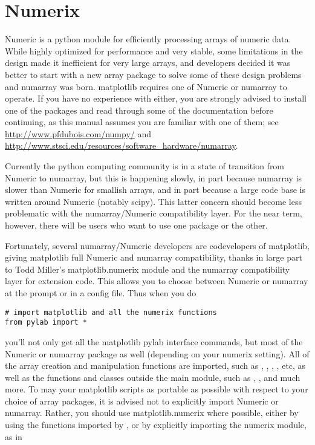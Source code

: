 \documentclass[twoside]{book}
\begin{document}
\section{Numerix}
\label{sec:numerix}

Numeric is a python module for efficiently processing arrays of
numeric data.  While highly optimized for performance and very stable,
some limitations in the design made it inefficient for very large
arrays, and developers decided it was better to start with a new array
package to solve some of these design problems and numarray was born.
matplotlib requires one of Numeric or numarray to operate.  If you
have no experience with either, you are strongly advised to install
one of the packages and read through some of the documentation before
continuing, as this manual assumes you are familiar with one of them;
see \url{http://www.pfdubois.com/numpy/} and
\url{http://www.stsci.edu/resources/software_hardware/numarray}.

Currently the python computing community is in a state of transition
from Numeric to numarray, but this is happening slowly, in part
because numarray is slower than Numeric for smallish arrays, and in
part because a large code base is written around Numeric (notably
scipy).  This latter concern should become less problematic with the
numarray/Numeric compatibility layer.  For the near term, however,
there will be users who want to use one package or the other.

Fortunately, several numarray/Numeric developers are codevelopers of
matplotlib, giving matplotlib full Numeric and numarray compatibility,
thanks in large part to Todd Miller's matplotlib.numerix module and
the numarray compatibility layer for extension code.  This allows you
to choose between Numeric or numarray at the prompt or in a config
file.  Thus when you do

\begin{lstlisting}
# import matplotlib and all the numerix functions
from pylab import *
\end{lstlisting}

\noindent you'll not only get all the matplotlib pylab interface
commands, but most of the Numeric or numarray package as well
(depending on your numerix setting).  All of the array creation and
manipulation functions are imported, such as ,
, , , etc, as well as the
functions and classes outside the main module, such as ,
,  and much more.  To may your matplotlib
scripts as portable as possible with respect to your choice of array
packages, it is advised not to explicitly import Numeric or numarray.
Rather, you should use matplotlib.numerix where possible, either by
using the functions imported by , or by
explicitly importing the numerix module, as in 
\end{document}
